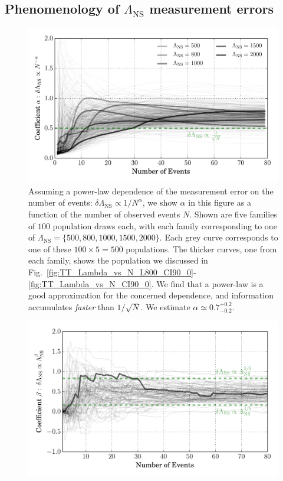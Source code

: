 \documentclass[aps,prd,amsmath,floats,floatfix, twocolumn,
superscriptaddress,nofootinbib,showpacs]{revtex4-1}
\newcommand{\lambdans}{\Lambda_\mathrm{NS}}
\begin{document}
\begin{appendix}



\section{Phenomenology of $\lambdans$ measurement errors}
% 
\begin{figure}
\centering    
\includegraphics[width=1.05\columnwidth]{plots/PowerLawCoefficient_LambdaErrorvsN_vs_N.pdf}
\caption{%
Assuming a power-law dependence of the measurement error on the number of
events: $\delta\lambdans\propto 1/N^\alpha$, we show $\alpha$ in this figure
as a function of the number of observed events $N$. Shown are five families
of $100$ population draws each, with each family corresponding to one of
$\lambdans=\{500,800,1000,1500,2000\}$. Each grey curve corresponds to one
of these $100\times5 = 500$ populations. The thicker curves, one from each
family, shows the population we discussed in
Fig.~\ref{fig:TT_Lambda_vs_N_L800_CI90_0}-\ref{fig:TT_Lambda_vs_N_CI90_0}.
We find that a power-law is a good approximation for the concerned dependence,
and information accumulates {\it faster} than $1/\sqrt{N}$. We estimate
$\alpha\simeq 0.7^{+0.2}_{-0.2}$.
}
\label{fig:TT_PowerLawLambdaErrorVsN}
\end{figure}
%
% 
\begin{figure}
\centering    
\includegraphics[width=\columnwidth]{plots/PowerLawCoefficient_LambdaErrorvsLambda_vs_N_AllPopulations.pdf}

\end{figure}
\end{appendix}
\end{document}
